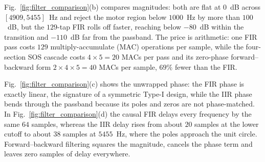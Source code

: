 Fig.~\ref{fig:filter_comparison}(b) compares magnitudes: both are flat at
$0$~dB across $[4909, 5455]$~Hz and reject the motor region below $1000$~Hz by
more than $100$~dB, but the $129$-tap FIR rolls off faster, reaching below
$-80$~dB within the transition and $-110$~dB far from the passband. The price is
arithmetic: one FIR pass costs $129$ multiply-accumulate (MAC) operations per
sample, while the four-section SOS cascade costs $4 \times 5 = 20$ MACs per pass
and its zero-phase forward--backward form $2 \times 4 \times 5 = 40$ MACs per
sample, $69\%$ fewer than the FIR.

Fig.~\ref{fig:filter_comparison}(c) shows the unwrapped phase: the FIR phase
is exactly linear, the signature of a symmetric Type-I design, while the IIR
phase bends through the passband because its poles and zeros are not
phase-matched. In Fig.~\ref{fig:filter_comparison}(d) the causal FIR delays
every frequency by the same $64$ samples, whereas the IIR delay rises from about
$20$ samples at the lower cutoff to about $38$ samples at $5455$~Hz, where the
poles approach the unit circle. Forward--backward filtering squares the
magnitude, cancels the phase term and leaves zero samples of delay everywhere.
